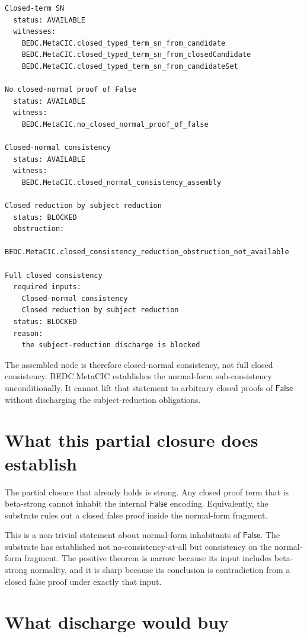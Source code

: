 \begin{verbatim}
Closed-term SN
  status: AVAILABLE
  witnesses:
    BEDC.MetaCIC.closed_typed_term_sn_from_candidate
    BEDC.MetaCIC.closed_typed_term_sn_from_closedCandidate
    BEDC.MetaCIC.closed_typed_term_sn_from_candidateSet

No closed-normal proof of False
  status: AVAILABLE
  witness:
    BEDC.MetaCIC.no_closed_normal_proof_of_false

Closed-normal consistency
  status: AVAILABLE
  witness:
    BEDC.MetaCIC.closed_normal_consistency_assembly

Closed reduction by subject reduction
  status: BLOCKED
  obstruction:
    BEDC.MetaCIC.closed_consistency_reduction_obstruction_not_available

Full closed consistency
  required inputs:
    Closed-normal consistency
    Closed reduction by subject reduction
  status: BLOCKED
  reason:
    the subject-reduction discharge is blocked
\end{verbatim}

The assembled node is therefore closed-normal consistency, not full closed
consistency. BEDC.MetaCIC establishes the normal-form sub-consistency
unconditionally. It cannot lift that statement to arbitrary closed proofs of
$\mathsf{False}$ without discharging the subject-reduction obligations.

\section{What this partial closure does establish}
\label{sec:closed-metacic-consistency-assembly-establishes}

The partial closure that already holds is strong. Any closed proof term that is
beta-strong cannot inhabit the internal $\mathsf{False}$ encoding. Equivalently,
the substrate rules out a closed false proof inside the normal-form fragment.

This is a non-trivial statement about normal-form inhabitants of
$\mathsf{False}$. The substrate has established not no-consistency-at-all but
consistency on the normal-form fragment. The positive theorem is narrow because
its input includes beta-strong normality, and it is sharp because its conclusion
is contradiction from a closed false proof under exactly that input.

\section{What discharge would buy}
\label{sec:closed-metacic-consistency-assembly-discharge-value}

